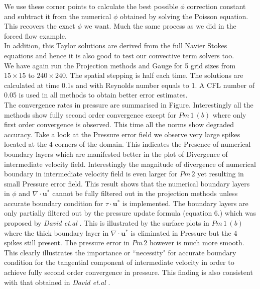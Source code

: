 We use these corner points to calculate the best possible $\phi$ correction constant and subtract it from the numerical $\phi$ obtained by solving the Poisson equation. This recovers the exact $\phi$ we want. Much the same process as we did in the forced flow example.\\

In addition, this Taylor solutions are derived from the full Navier Stokes equations and hence it is also good to test our convective term solvers too.\\

We have again run the Projection methods and Gauge for 5 grid sizes from $15 \times 15$ to $240 \times 240$. The spatial stepping is half each time. The solutions are calculated at time 0.1s and with Reynolds number equals to 1. A CFL number of 0.05 is used in all methods to obtain better error estimates.\\

The convergence rates in pressure are summarised in Figure. Interestingly all the methods show fully second order convergence except for $Pm\,1\,(b)$ where only first order convergence is observed. This time all the norms show degraded accuracy. Take a look at the Pressure error field we observe very large spikes located at the 4 corners of the domain. This indicates the Presence of numerical boundary layers which are manifested better in the plot of Divergence of intermediate velocity field. Interestingly the magnitude of divergence of numerical boundary in intermediate velocity field is even larger for $Pm\,2$ yet resulting in small Pressure error field. This result shows that the numerical boundary layers in $\phi$ and $\nabla \cdot \textbf{u}^*$ cannot be fully filtered out in the projection methods unless accurate boundary condition for $\textbf{$\tau$} \cdot \textbf{u}^*$ is implemented. The boundary layers are only partially filtered out by the pressure update formula (equation 6.) which was proposed by \emph{David et.al} \cite{brown2001accurate}. This is illustrated by the surface plots in $Pm\,1\,(b)$ where the thick boundary layer in $\nabla \cdot \textbf{u}^*$ is eliminated in Pressure but the 4 spikes still present. The pressure error  in $Pm\,2$  however is much more smooth. This clearly illustrates the importance or ``necessity" for accurate boundary condition for the tangential component of intermediate velocity in order to achieve fully second order convergence in pressure. This finding is also consistent with that obtained in \emph{David et.al} \cite{brown2001accurate}.\\

